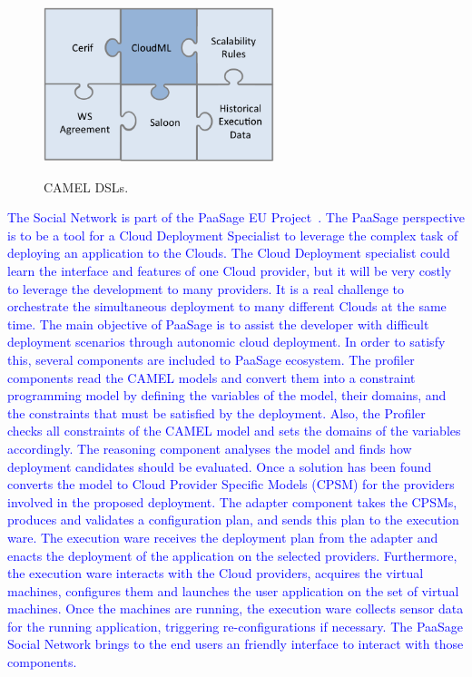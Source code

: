 \begin{figure}[h]
	\caption{CAMEL DSLs.}
	\includegraphics[width=0.6\textwidth,natwidth=200,natheight=150]{./fig/dsl.png}
	\centering
	\label{fig:dsls}
\end{figure}

\textcolor{blue}{The Social Network is part of the PaaSage EU Project~\cite{paasage}.
The PaaSage perspective is to be a tool for a Cloud Deployment Specialist to leverage the complex task of deploying an application to the Clouds. The Cloud Deployment specialist could learn the interface and features of one Cloud provider, but it will be very costly to leverage the development to many providers. It is a real challenge to orchestrate the simultaneous deployment to many different Clouds at the same time. The main objective of PaaSage is to assist the developer with difficult deployment scenarios through autonomic cloud deployment. In order to satisfy this, several components are included to PaaSage ecosystem. The profiler components read the CAMEL models and convert them into a constraint programming model by defining the variables of the model, their domains, and the constraints that must be satisfied by the deployment. Also, the Profiler checks all constraints of the CAMEL model and sets the domains of the variables accordingly. The reasoning component analyses the model and finds how deployment candidates should be evaluated. Once a solution has been found converts the model to Cloud Provider Specific Models (CPSM) for the providers involved in the proposed deployment. The adapter component takes the CPSMs, produces and validates a configuration plan, and sends this plan to the execution ware. The execution ware receives the deployment plan from the adapter and enacts the deployment of the application on the selected providers. Furthermore, the execution ware interacts with the Cloud providers, acquires the virtual machines, configures them and launches the user application on the set of virtual machines. Once the machines are running, the execution ware collects sensor data for the running application, triggering re-configurations if necessary.}
\textcolor{blue}{The PaaSage Social Network brings to the end users an friendly interface to interact with those components.}



